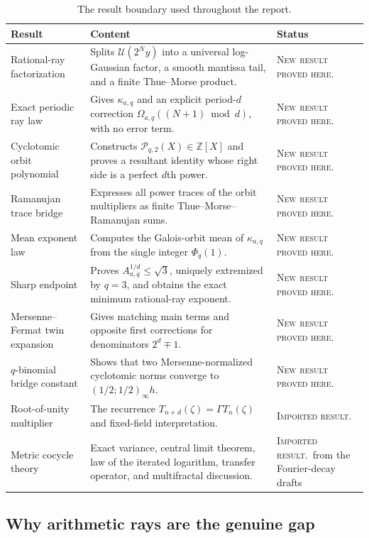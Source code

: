 \documentclass[11pt,oneside]{article}
\theoremstyle{definition}
\theoremstyle{remark}
\newcommand{\Z}{\mathbb Z}
\newcommand{\newresult}{\textcolor{newgreen}{\textsc{New result proved here.}}}
\newcommand{\imported}{\textcolor{importblue}{\textsc{Imported result.}}}
\begin{document}
\begin{table}[ht]
\centering\small
\begin{tabularx}{\textwidth}{@{}p{}X p{}@{}}
\toprule
Result & Content & Status \\
\midrule
Rational-ray factorization & Splits $\mathscr U(2^Ny)$ into a universal log-Gaussian factor, a smooth mantissa tail, and a finite Thue--Morse product. & \newresult \\
Exact periodic ray law & Gives $\kappa_{a,q}$ and an explicit period-$d$ correction $\Omega_{a,q}((N+1)\bmod d)$, with no error term. & \newresult \\
Cyclotomic orbit polynomial & Constructs $\mathscr P_{q,2}(X)\in\Z[X]$ and proves a resultant identity whose right side is a perfect $d$th power. & \newresult \\
Ramanujan trace bridge & Expresses all power traces of the orbit multipliers as finite Thue--Morse--Ramanujan sums. & \newresult \\
Mean exponent law & Computes the Galois-orbit mean of $\kappa_{a,q}$ from the single integer $\Phi_q(1)$. & \newresult \\
Sharp endpoint & Proves $A_{a,q}^{1/d}\le\sqrt3$, uniquely extremized by $q=3$, and obtains the exact minimum rational-ray exponent. & \newresult \\
Mersenne--Fermat twin expansion & Gives matching main terms and opposite first corrections for denominators $2^d\mp1$. & \newresult \\
$q$-binomial bridge constant & Shows that two Mersenne-normalized cyclotomic norms converge to $(1/2;1/2)_\infty h$. & \newresult \\
Root-of-unity multiplier & The recurrence $T_{n+d}(\zeta)=\Gamma T_n(\zeta)$ and fixed-field interpretation. & \imported\ \cite{sobolewski2019} \\
Metric cocycle theory & Exact variance, central limit theorem, law of the iterated logarithm, transfer operator, and multifractal discussion. & \imported\ from the Fourier-decay drafts \\
\bottomrule
\end{tabularx}
\caption{The result boundary used throughout the report.}\label{tab:main-results}
\end{table}

\subsection{Why arithmetic rays are the genuine gap}
\end{document}
